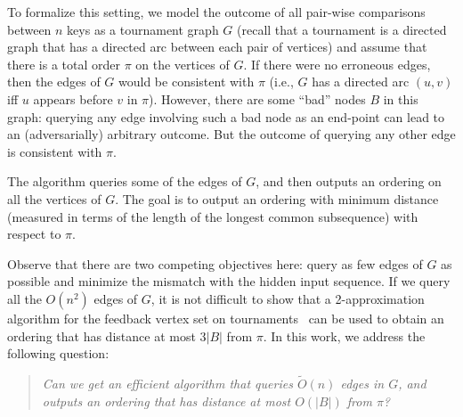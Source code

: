 \documentclass[11pt]{llncs}
\begin{document}
To formalize this setting, we model the outcome of all pair-wise comparisons between $n$ keys as a tournament graph $G$ (recall that a tournament is a directed graph that has a directed arc between each pair of vertices) and assume that there is a total order $\pi$ on the vertices of $G$. If there were no erroneous edges, then the edges of $G$ would be consistent with $\pi$ (i.e., $G$ has a directed arc $(u,v)$ iff $u$ appears before $v$ in $\pi$). However, there are some ``bad'' nodes $B$ in this graph: querying any edge involving such a bad node as an end-point can lead to an (adversarially) arbitrary outcome. But the outcome of querying any other edge is consistent with $\pi$.  

The algorithm queries some of the edges of $G$, and then outputs an ordering on all the vertices of $G$. 
The goal is to output an ordering with minimum distance (measured in terms of the length of the longest common subsequence) with respect to $\pi$. 

Observe that there are two competing objectives here: query as few edges of $G$ as possible and minimize the mismatch with the hidden input sequence. If we query all the $O(n^2)$ edges of $G$, it is not difficult to show that a 2-approximation algorithm for the feedback vertex set on tournaments~\cite{fvst} can be used to obtain an ordering that has distance at most $3|B|$ from $\pi$.  In this work, we address the following question: 
\begin{quote}
    \emph{Can we get an efficient algorithm that queries $\tilde{O}(n)$ edges in $G$, and outputs an ordering that has distance at most $O(|B|)$ from $\pi$? }
\end{quote}
\end{document}
